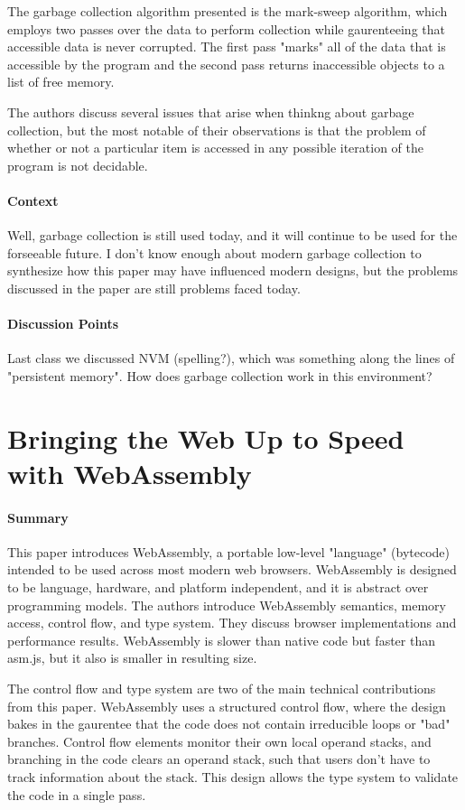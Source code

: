 The garbage collection algorithm presented is the mark-sweep algorithm,
which employs two passes over the data to perform collection while
gaurenteeing that accessible data is never corrupted. The first pass "marks"
all of the data that is accessible by the program and the second pass
returns inaccessible objects to a list of free memory.

The authors discuss several issues that arise when thinkng about garbage
collection, but the most notable of their observations is that the
problem of whether or not a particular item is accessed in any possible
iteration of the program is not decidable. 
\paragraph{\textbf{Context}}
Well, garbage collection is still used today, and it will continue to be
used for the forseeable future. I don't know enough about modern garbage
collection to synthesize how this paper may have influenced modern designs,
but the problems discussed in the paper are still problems faced today.
\paragraph{\textbf{Discussion Points}}
Last class we discussed NVM (spelling?), which was something along the
lines of "persistent memory". How does garbage collection work in this
environment?


\section {Bringing the Web Up to Speed with WebAssembly \cite{haas2017bringing}}


\paragraph{\textbf{Summary}}
This paper introduces WebAssembly, a portable low-level "language"
(bytecode) intended to be used across most modern web browsers. WebAssembly
is designed to be language, hardware, and platform independent, and it is
abstract over programming models. The authors introduce WebAssembly
semantics, memory access, control flow, and type system. They discuss
browser implementations and performance results. WebAssembly is slower than
native code but faster than asm.js, but it also is smaller in resulting
size.

The control flow and type system are two of the main technical contributions
from this paper. WebAssembly uses a structured control flow, where the
design bakes in the gaurentee that the code does not contain irreducible
loops or "bad" branches. Control flow elements monitor their own local
operand stacks, and branching in the code clears an operand stack, such that
users don't have to track information about the stack. This design allows
the type system to validate the code in a single pass.


